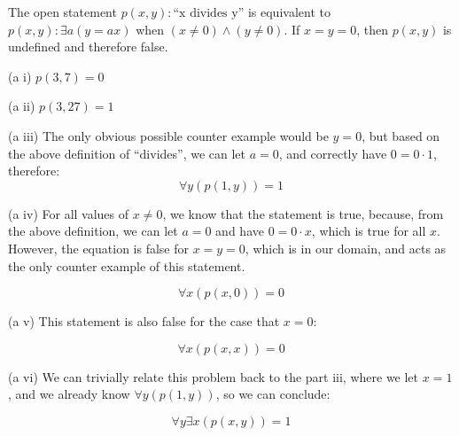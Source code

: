 \documentclass{article}
\newcommand{\T}{1}
\newcommand{\F}{0}
\newcommand{\subproblem}[1]{(#1)}
\begin{document}
\begin{multicols*}{2}
The open statement $p(x,y): \text{``x divides y''}$ is equivalent to
$p(x,y):\exists a(y=ax)$ when $(x\ne 0)\wedge(y\ne 0)$. If $x=y=0$,
then $p(x,y)$ is undefined and therefore false.

\subproblem{a i} $p(3,7) = \boxed{\F}$

\subproblem{a ii} $p(3, 27) = \boxed{\T}$

\subproblem{a iii} The only obvious possible counter example would be
$y=0$, but based on the above definition of ``divides'', we can let
$a=0$, and correctly have $0=0\cdot{}1$, therefore: \[
\forall y(p(1, y)) = \boxed{\T}
\]

\subproblem{a iv} For all values of $x\ne 0$, we know that the
statement is true, because, from the above definition, we can let
$a=0$ and have $0=0\cdot x$, which is true for all $x$. However, the
equation is false for $x=y=0$, which is in our domain, and acts as the
only counter example of this statement.

\[
\forall x(p(x, 0)) = \boxed{\F}
\]

\subproblem{a v} This statement is also false for the case that $x=0$:

\[
\forall x(p(x,x)) = \boxed{\F}
\]

\subproblem{a vi} We can trivially relate this problem back to the
part iii, where we let $x=1$, and we already know $\forall y(p(1,y))$,
so we can conclude:

\[
\forall y\exists x(p(x,y)) = \boxed{\T}
\]

\end{multicols*}
\end{document}
